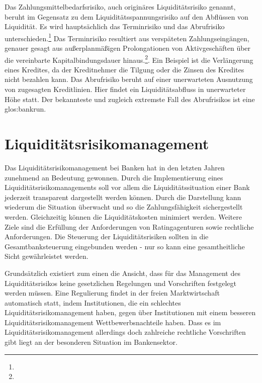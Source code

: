 \begin{onehalfspacing}
Das Zahlungsmittelbedarfsrisiko, auch originäres Liquiditätsrisiko genannt, beruht im Gegensatz zu dem Liquiditätsspannungsrisiko auf den Abflüssen von Liquidität. Es wird hauptsächlich das Terminrisiko und das Abrufrisiko unterschieden.\footnote{ } Das Terminrisiko resultiert aus verspäteten Zahlungseingängen, genauer gesagt aus außerplanmäßigen Prolongationen von Aktivgeschäften über die vereinbarte Kapitalbindungsdauer hinaus.\footnote{ }. Ein Beispiel ist die Verlängerung eines Kredites, da der Kreditnehmer die Tilgung oder die Zinsen des Kredites nicht bezahlen kann. Das Abrufrisiko beruht auf einer unerwarteten Ausnutzung von zugesagten Kreditlinien. Hier findet ein Liquiditätsabfluss in unerwarteter Höhe statt. Der bekannteste und zugleich extremste Fall des Abrufrisikos ist eine \gls{glos:bankrun}.


\section{Liquiditätsrisikomanagement}
Das Liquiditätsrisikomanagement bei Banken hat in den letzten Jahren zunehmend an Bedeutung gewonnen. Durch die Implementierung eines Liquiditätsrisikomanagements  soll vor allem die Liquiditätssituation einer Bank jederzeit transparent dargestellt werden können. Durch die Darstellung kann wiederum die Situation überwacht und so die Zahlungsfähigkeit sichergestellt werden. Gleichzeitig können die Liquiditätskosten minimiert werden. Weitere Ziele sind die Erfüllung der Anforderungen von Ratingagenturen sowie rechtliche Anforderungen. Die Steuerung der Liquiditätsrisiken sollten in die Gesamtbanksteuerung eingebunden werden - nur so kann eine gesamtheitliche Sicht gewährleistet werden.

Grundsätzlich existiert zum einen die Ansicht, dass für das Management des Liquiditätsrisikos keine gesetzlichen Regelungen und Vorschriften festgelegt werden müssen. Eine Regulierung findet in der freien Marktwirtschaft automatisch statt, indem Institutionen, die ein schlechtes Liquiditätsrisikomanagement haben, gegen über Institutionen mit einem besseren Liquiditätsrisikomanagement Wettbewerbsnachteile haben. Dass es im Liquiditätsrisikomanagement allerdings doch zahlreiche rechtliche Vorschriften gibt liegt an der besonderen Situation im Bankensektor.


\end{onehalfspacing}
